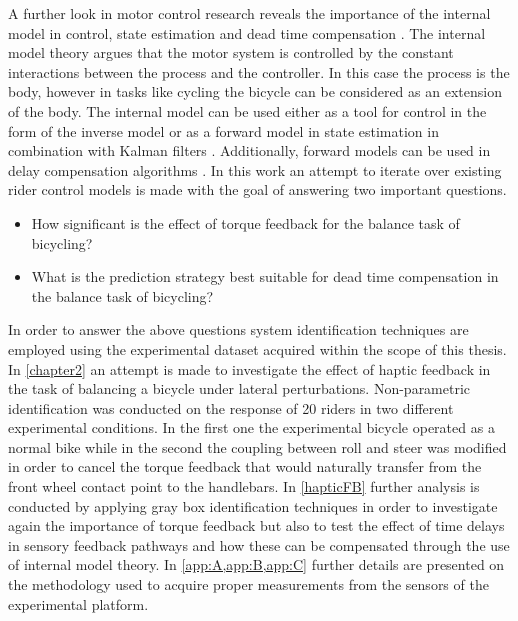A further look in motor control research  reveals the importance of the internal model in control, state estimation and dead time compensation \cite{francis1976internal, garcia1982internal, wolpert1995internal, gillespie2016human}. The internal model  theory argues that the motor system is controlled by the constant interactions between the process and the controller. In this case the process is the body, however in tasks like cycling the bicycle can be considered as an extension of the body. The internal model can be used either as a tool for control in the form of the inverse model \cite{edelmann2015,getz1995internal} or as a forward model in state estimation in combination with Kalman filters \cite{wolpert1995internal}. Additionally, forward models can be used in delay compensation algorithms \cite{miall1993cerebellum,van2001adaptive}. 
\newpage
In this work an attempt to iterate over existing rider control models is made with the goal of answering two important questions. 
\begin{itemize}
        \item How significant is the effect of torque feedback for the balance task of bicycling?
        \item What is the prediction strategy best suitable for dead time  compensation in the balance task of bicycling?
\end{itemize}

In order to answer the above questions system identification techniques are employed using  the experimental dataset acquired within the scope of this thesis. In \cref{chapter2} an attempt is made to investigate the effect of haptic feedback in the task of balancing a bicycle under lateral perturbations. Non-parametric identification was conducted on the response of 20 riders in two different experimental conditions. In the first one the experimental bicycle operated as a normal bike while in the second the coupling between roll and steer was modified in order to cancel the torque feedback that would naturally transfer from the front wheel contact point to the handlebars. In \cref{hapticFB} further analysis is conducted by applying gray box identification techniques in order to investigate again the importance of torque feedback but also to test the effect of time delays in sensory feedback pathways and how these can be compensated through the use of internal model theory. In \cref{app:A,app:B,app:C} further details are presented on the methodology used to acquire proper measurements from the sensors of the experimental platform.


